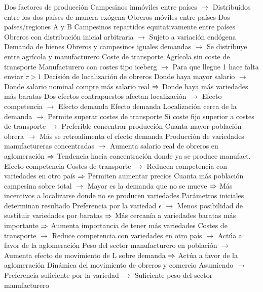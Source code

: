 \documentclass{nuevotema}
\begin{document}
\begin{esquemal}
				\4 Dos factores de producción
				\4[] Campesinos inmóviles entre países
				\4[] $\to$ Distribuidos entre los dos países de manera exógena
				\4[] Obreros móviles entre países
				\4 Dos países/regiones A y B
				\4[] Campesinos repartidos equitativamente entre países
				\4[] Obreros con distribución inicial arbitraria
				\4[] $\to$ Sujeto a variación endógena
				\4 Demanda de bienes
				\4[] Obreros y campesinos iguales demandas
				\4[] $\to$ Se distribuye entre agrícola y manufacturero
				\4 Coste de transporte
				\4[] Agrícola sin coste de transporte
				\4[] Manufacturero con costes tipo iceberg
				\4[] $\to$ Para que llegue 1 hace falta enviar $\tau > 1$
				\4 Decisión de localización de obreros
				\4[] Donde haya mayor salario
				\4[] $\to$ Donde salario nominal compre más salario real
				\4[] $\Rightarrow$ Donde haya más variedades más baratas
				\4[] Dos efectos contrapuestos afectan localización
				\4[] $\to$ Efecto competencia
				\4[] $\to$ Efecto demanda
				\4 Efecto demanda
				\4[] Localización cerca de la demanda
				\4[] $\to$ Permite superar costes de transporte
				\4[] Si coste fijo superior a costes de transporte
				\4[] $\to$ Preferible concentrar producción
				\4[] Cuanta mayor población obrera
				\4[] $\to$ Más se retroalimenta el efecto demanda
				\4[] Producción de variedades manufactureras concentradas
				\4[] $\to$ Aumenta salario real de obreros en aglomeración
				\4[] $\Rightarrow$ Tendencia hacia concentración donde ya se produce manufact.
				\4 Efecto competencia
				\4[] Costes de transporte
				\4[] $\to$ Reducen competencia con variedades en otro país
				\4[] $\Rightarrow$ Permiten aumentar precios
				\4[] Cuanta más población campesina sobre total
				\4[] $\to$ Mayor es la demanda que no se mueve
				\4[] $\Rightarrow$ Más incentivos a localizarse donde no se producen variedades
				\4 Parámetros iniciales determinan resultado
				\4[] Preferencia por la variedad $\epsilon$
				\4[] $\to$ Menos posibilidad de sustituir variedades por baratas
				\4[] $\Rightarrow$ Más cercanía a variedades baratas más importante
				\4[] $\Rightarrow$ Aumenta importancia de tener más variedades
				\4[] Costes de transporte
				\4[] $\to$ Reduce competencia con variedades en otro país
				\4[] $\to$ Actúa a favor de la aglomeración
				\4[] Peso del sector manufacturero en población
				\4[] $\to$ Aumenta efecto de movimiento de L sobre demanda
				\4[] $\Rightarrow$ Actúa a favor de la aglomeración
				\4 Dinámica del movimiento de obreros y comercio
				\4[] Asumiendo
				\4[] $\to$ Preferencia suficiente por la variedad
				\4[] $\to$ Suficiente peso del sector manufacturero

\end{esquemal}
\end{document}
